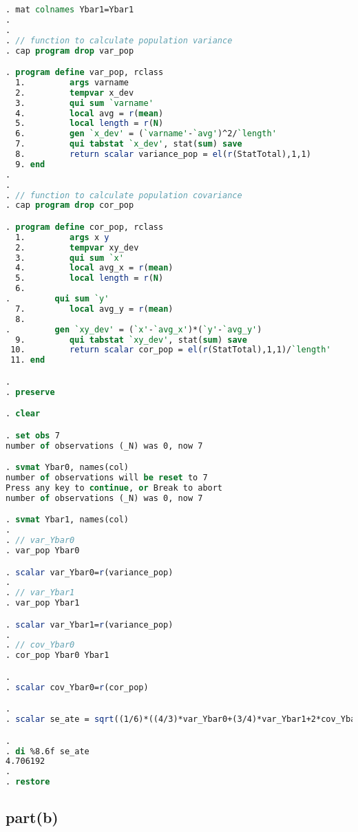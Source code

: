 \documentclass[a4paper]{article}
\begin{document}
\begin{lstlisting}[language=stata]
. mat colnames Ybar1=Ybar1 
. 
. 
. // function to calculate population variance
. cap program drop var_pop

. program define var_pop, rclass
  1.         args varname    
  2.         tempvar x_dev 
  3.         qui sum `varname'
  4.         local avg = r(mean)
  5.         local length = r(N)     
  6.         gen `x_dev' = (`varname'-`avg')^2/`length'
  7.         qui tabstat `x_dev', stat(sum) save
  8.         return scalar variance_pop = el(r(StatTotal),1,1)
  9. end
. 
. 
. // function to calculate population covariance
. cap program drop cor_pop

. program define cor_pop, rclass
  1.         args x y        
  2.         tempvar xy_dev 
  3.         qui sum `x'
  4.         local avg_x = r(mean)
  5.         local length = r(N)     
  6.         
.         qui sum `y'
  7.         local avg_y = r(mean)
  8.                 
.         gen `xy_dev' = (`x'-`avg_x')*(`y'-`avg_y')
  9.         qui tabstat `xy_dev', stat(sum) save
 10.         return scalar cor_pop = el(r(StatTotal),1,1)/`length'
 11. end

. 
. preserve 

. clear

. set obs 7
number of observations (_N) was 0, now 7

. svmat Ybar0, names(col)
number of observations will be reset to 7
Press any key to continue, or Break to abort
number of observations (_N) was 0, now 7

. svmat Ybar1, names(col)
. 
. // var_Ybar0    
. var_pop Ybar0

. scalar var_Ybar0=r(variance_pop)
. 
. // var_Ybar1 
. var_pop Ybar1

. scalar var_Ybar1=r(variance_pop)
. 
. // cov_Ybar0 
. cor_pop Ybar0 Ybar1

. 
. scalar cov_Ybar0=r(cor_pop)

. 
. scalar se_ate = sqrt((1/6)*((4/3)*var_Ybar0+(3/4)*var_Ybar1+2*cov_Ybar0))

. 
. di %8.6f se_ate
4.706192
. 
. restore
\end{lstlisting}

\subsection*{part(b)}
\end{document}
